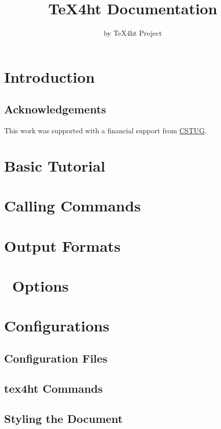 \documentclass{book}
\title{TeX4ht Documentation}
\author{by TeX4ht Project}
\begin{document}
\maketitle

\ifdefined\HCode\else\tableofcontents\fi


\chapter{Introduction}

\section{Acknowledgements}

This work was supported with a financial support from \href{https://cstug.cz/}{CSTUG}.

\chapter{Basic Tutorial}
\chapter{Calling Commands}

\label{sec:calling-commands}
\chapter{Output Formats}
\chapter{\texfourht\ Options}



\chapter{Configurations}
\section{Configuration Files}

\section{tex4ht Commands}

\section{Styling the Document}
\end{document}
